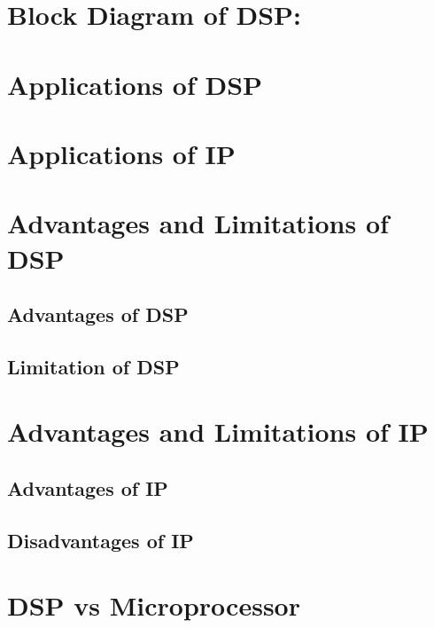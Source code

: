 \documentclass{article}
\begin{document}
\begin{multicols}{2}
    \section{Block Diagram of DSP:}
    \section{Applications of DSP}
    \section{Applications of IP} 
    \section{Advantages and Limitations of DSP}
        \subsection{Advantages of DSP}
        \subsection{Limitation of DSP}
    \section{Advantages and Limitations of IP} 
        \subsection{Advantages of IP} 
        \subsection{Disadvantages of IP} 
    \section{DSP vs Microprocessor}
    \end{multicols}
    \cite{latexcompanion}

    \begin{thebibliography}
    \end{thebibliography}
\end{document}
